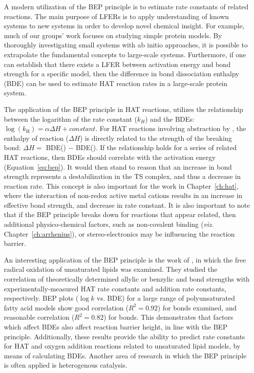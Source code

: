 \begin{doublespace}
A modern utilization of the BEP principle is to estimate rate constants of
related reactions. The main purpose of LFERs is to apply understanding of known
systems to new systems in order to develop novel chemical insight. For example,
much of our groups' work focuses on studying simple protein models. By
thoroughly investigating small systems with ab initio approaches, it is possible
to extrapolate the fundamental concepts to large-scale systems. Furthermore, if
one can establish that there exists a LFER between activation energy and bond
strength for a specific model, then the difference in bond dissociation enthalpy
(BDE) can be used to estimate HAT reaction rates in a large-scale protein
system.

The application of the BEP principle in HAT reactions, utilizes the relationship
between the logarithm of the rate constant ($k_H$) and the BDEs:
$\log(k_\mathrm{H}) = \alpha \Delta H + constant$. For HAT reactions involving
abstraction by \cumo, the enthalpy of reaction ($\Delta H$) is directly related
to the strength of the breaking bond: $\Delta H =$ BDE() $-$
BDE(). If the relationship holds for a series of related HAT
reactions, then BDEs should correlate with the activation energy
(Equation~\ref{eq:bep}). It would then stand to reason that an increase in bond
strength represents a destabilization in the TS complex, and thus a decrease in
reaction rate. This concept is also important for the work in
Chapter~\ref{ch:hat}, where the interaction of non-redox active metal cations
results in an increase in effective bond strength, and decrease in rate
constant. It is also important to note that if the BEP principle breaks down for
reactions that appear related, then additional physico-chemical factors, such as
non-covalent binding (\emph{viz.} Chapter~\ref{ch:arrhenius}), or
stereo-electronics may be influencing the reaction barrier.

An interesting application of the BEP principle is the work of
\citet{Pratt2003}, in which the free radical oxidation of unsaturated lipids was
examined. They studied the correlation of theoretically determined allylic or
benzylic  and  bond strengths with experimentally-measured
HAT rate constants and  addition rate constants, respectively. BEP plots
($\log k$ vs. BDE) for a large range of polyunsaturated fatty acid models show
good correlation ($R^2 = 0.92$) for  bonds examined, and reasonable
correlation ($R^2 = 0.82$) for  bonds. This demonstrates that factors
which affect BDEs also affect reaction barrier height, in line with the BEP
principle. Additionally, these results provide the ability to predict rate
constants for HAT and oxygen addition reactions related to unsaturated lipid
models, by means of calculating BDEs. Another area of research in which the BEP
principle is often applied is heterogenous catalysis.\cite{Panov2015}


\end{doublespace}
